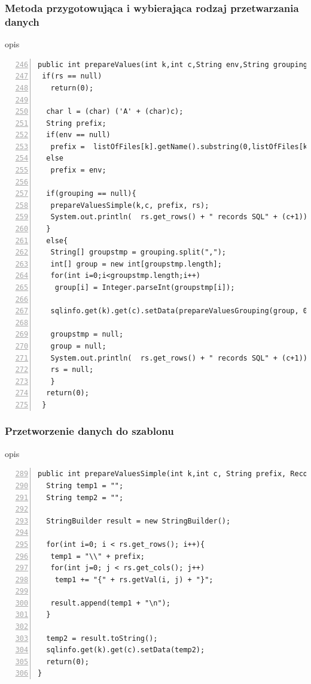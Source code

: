 \subsubsection*{Metoda przygotowująca i wybierająca rodzaj przetwarzania danych}
opis

 \begin{lstlisting}[numbers=left,firstnumber=246]
public int prepareValues(int k,int c,String env,String grouping,RecordSet rs){
 if(rs == null)
   return(0);

  char l = (char) ('A' + (char)c);
  String prefix;
  if(env == null)
   prefix =  listOfFiles[k].getName().substring(0,listOfFiles[k].getName().indexOf('.')) + l;
  else
   prefix = env;
      
  if(grouping == null){
   prepareValuesSimple(k,c, prefix, rs);
   System.out.println(  rs.get_rows() + " records SQL" + (c+1));  
  }
  else{
   String[] groupstmp = grouping.split(",");
   int[] group = new int[groupstmp.length];
   for(int i=0;i<groupstmp.length;i++)
    group[i] = Integer.parseInt(groupstmp[i]);
           
   sqlinfo.get(k).get(c).setData(prepareValuesGrouping(group, 0,0,rs.get_rows(),  rs, prefix)); 
          
   groupstmp = null;
   group = null;
   System.out.println(  rs.get_rows() + " records SQL" + (c+1));   
   rs = null;
   }
  return(0);  
 }
  \end{lstlisting}


\subsubsection*{Przetworzenie danych  do szablonu}

opis
 \begin{lstlisting}[numbers=left,firstnumber=289]
 public int prepareValuesSimple(int k,int c, String prefix, RecordSet rs){
  String temp1 = "";
  String temp2 = "";

  StringBuilder result = new StringBuilder(); 
       
  for(int i=0; i < rs.get_rows(); i++){
   temp1 = "\\" + prefix;
   for(int j=0; j < rs.get_cols(); j++)
    temp1 += "{" + rs.getVal(i, j) + "}";
        
   result.append(temp1 + "\n");
  }

  temp2 = result.toString();
  sqlinfo.get(k).get(c).setData(temp2); 
  return(0);
}
  \end{lstlisting}





